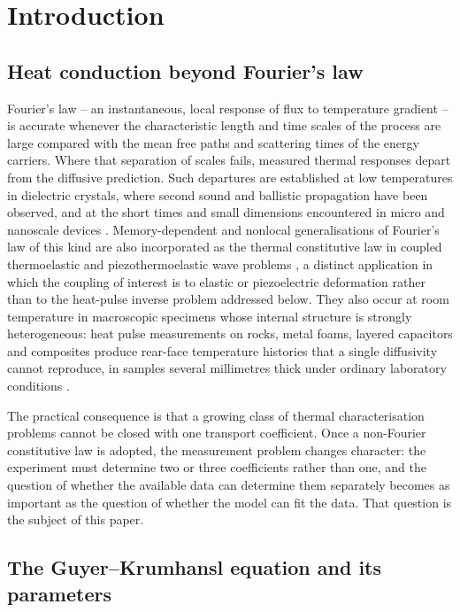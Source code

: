 \documentclass[preprint,12pt,a4paper]{elsarticle}
\theoremstyle{plain}
\theoremstyle{definition}
\theoremstyle{remark}
\begin{document}
\section{Introduction}
\label{sec:introduction}

\subsection{Heat conduction beyond Fourier's law}

Fourier's law -- an instantaneous, local response of flux to temperature
gradient -- is accurate whenever the characteristic length and time scales of
the process are large compared with the mean free paths and scattering times of
the energy carriers. Where that separation of scales fails, measured thermal
responses depart from the diffusive prediction. Such departures are established
at low temperatures in dielectric crystals, where second sound and ballistic
propagation have been observed, and at the short times and small dimensions
encountered in micro and nanoscale devices \cite{Sobolev2025,Moghadam2025}.
Memory-dependent and nonlocal generalisations of Fourier's law of this kind
are also incorporated as the thermal constitutive law in coupled
thermoelastic and piezothermoelastic wave problems
\cite{Gupta2024Rayleigh,Gupta2024PhotoThermo,Gupta2023EnergyInterface,Gupta2023Reflection},
a distinct application in which the coupling of interest is to elastic or
piezoelectric deformation rather than to the heat-pulse inverse problem
addressed below. They
also occur at room temperature in macroscopic specimens whose internal structure
is strongly heterogeneous: heat pulse measurements on rocks, metal foams,
layered capacitors and composites produce rear-face temperature histories that a
single diffusivity cannot reproduce, in samples several millimetres thick under
ordinary laboratory conditions \cite{Both2016,Van2017}.

The practical consequence is that a growing class of thermal characterisation
problems cannot be closed with one transport coefficient. Once a non-Fourier
constitutive law is adopted, the measurement problem changes character: the
experiment must determine two or three coefficients rather than one, and the
question of whether the available data can determine them separately becomes as
important as the question of whether the model can fit the data. That question
is the subject of this paper.

\subsection{The Guyer--Krumhansl equation and its parameters}
\end{document}
